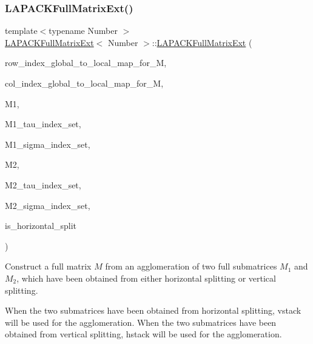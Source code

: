 \subsubsection{\texorpdfstring{L\+A\+P\+A\+C\+K\+Full\+Matrix\+Ext()}{LAPACKFullMatrixExt()}\hspace{0.1cm}{\footnotesize\ttfamily [8/10]}}
{\footnotesize\ttfamily template$<$typename Number $>$ \\
\hyperlink{classLAPACKFullMatrixExt}{L\+A\+P\+A\+C\+K\+Full\+Matrix\+Ext}$<$ Number $>$\+::\hyperlink{classLAPACKFullMatrixExt}{L\+A\+P\+A\+C\+K\+Full\+Matrix\+Ext} (\begin{DoxyParamCaption}\item[{const std\+::map$<$ types\+::global\+\_\+dof\+\_\+index, size\+\_\+t $>$ \&}]{row\+\_\+index\+\_\+global\+\_\+to\+\_\+local\+\_\+map\+\_\+for\+\_\+M,  }\item[{const std\+::map$<$ types\+::global\+\_\+dof\+\_\+index, size\+\_\+t $>$ \&}]{col\+\_\+index\+\_\+global\+\_\+to\+\_\+local\+\_\+map\+\_\+for\+\_\+M,  }\item[{const \hyperlink{classLAPACKFullMatrixExt}{L\+A\+P\+A\+C\+K\+Full\+Matrix\+Ext}$<$ Number $>$ \&}]{M1,  }\item[{const std\+::vector$<$ types\+::global\+\_\+dof\+\_\+index $>$ \&}]{M1\+\_\+tau\+\_\+index\+\_\+set,  }\item[{const std\+::vector$<$ types\+::global\+\_\+dof\+\_\+index $>$ \&}]{M1\+\_\+sigma\+\_\+index\+\_\+set,  }\item[{const \hyperlink{classLAPACKFullMatrixExt}{L\+A\+P\+A\+C\+K\+Full\+Matrix\+Ext}$<$ Number $>$ \&}]{M2,  }\item[{const std\+::vector$<$ types\+::global\+\_\+dof\+\_\+index $>$ \&}]{M2\+\_\+tau\+\_\+index\+\_\+set,  }\item[{const std\+::vector$<$ types\+::global\+\_\+dof\+\_\+index $>$ \&}]{M2\+\_\+sigma\+\_\+index\+\_\+set,  }\item[{bool}]{is\+\_\+horizontal\+\_\+split }\end{DoxyParamCaption})}

Construct a full matrix $M$ from an agglomeration of two full submatrices $M_1$ and $M_2$, which have been obtained from either horizontal splitting or vertical splitting.

When the two submatrices have been obtained from horizontal splitting, {\ttfamily vstack} will be used for the agglomeration. When the two submatrices have been obtained from vertical splitting, {\ttfamily hstack} will be used for the agglomeration.

